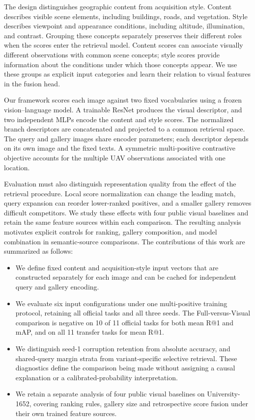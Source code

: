 \documentclass[journal]{IEEEtran}
\begin{document}
The design distinguishes geographic content from acquisition style.
Content describes visible scene elements, including buildings, roads, and
vegetation. Style describes viewpoint and appearance conditions, including
altitude, illumination, and contrast. Grouping these concepts separately
preserves their different roles when the scores enter the retrieval model.
Content scores can associate visually different observations with common
scene concepts; style scores provide information about the conditions under
which those concepts appear. We use these groups as explicit input
categories and learn their relation to visual features in the fusion head.

Our framework scores each image against two fixed vocabularies using a
frozen vision--language model. A trainable ResNet produces the visual
descriptor, and two independent MLPs encode the content and style scores.
The normalized branch descriptors are concatenated and projected to a common
retrieval space. The query and gallery images share encoder parameters;
each descriptor depends on its own image and the fixed texts. A symmetric
multi-positive contrastive objective accounts for the multiple UAV
observations associated with one location.

Evaluation must also distinguish representation quality from the effect of
the retrieval procedure. Local score normalization can change the leading
match, query expansion can reorder lower-ranked positives, and a smaller
gallery removes difficult competitors. We study these effects with four
public visual baselines and retain the same feature sources within each
comparison. The resulting analysis motivates explicit controls for ranking,
gallery composition, and model combination in semantic-source comparisons.
The contributions of this work are summarized as follows:
\begin{itemize}
  \item We define fixed content and acquisition-style input vectors that are
  constructed separately for each image and can be cached for independent
  query and gallery encoding.
  \item We evaluate six input configurations under one multi-positive
  training protocol, retaining all official tasks and all three seeds.
  The Full-versus-Visual comparison is negative on 10 of 11 official tasks
  for both mean R@1 and mAP, and on all 11 transfer tasks for mean R@1.
  \item We distinguish seed-1 corruption retention from absolute accuracy,
  and shared-query margin strata from variant-specific selective retrieval.
  These diagnostics define the comparison being made without assigning a
  causal explanation or a calibrated-probability interpretation.
  \item We retain a separate analysis of four public visual baselines on
  University-1652, covering ranking rules, gallery size and retrospective
  score fusion under their own trained feature sources.
\end{itemize}
\end{document}
